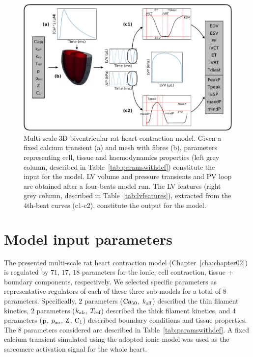 \begin{figure}[ht!]
    \myfloatalign
    \includegraphics[width=\textwidth]{figures/chapter03/simulator_framework.pdf}
    \caption{Multi-scale $3$D biventricular rat heart contraction model. Given a fixed calcium transient (a) and mesh with fibres (b), parameters representing cell, tissue and haemodynamics properties (left grey column, described in Table~\ref{tab:paramswithdef}) constitute the input for the model. LV volume and pressure transients and PV loop are obtained after a four-beats model run. The LV features (right grey column, described in Table~\ref{tab:lvfeatures}), extracted from the $4$th-beat curves (c1-c2), constitute the output for the model.}
    \label{fig:simulatorframework}
\end{figure}


%
%
%
\section{Model input parameters}\label{sec:ch3modelinputparameters}
The presented multi-scale rat heart contraction model (Chapter~\ref{cha:chapter02}) is regulated by $71$, $17$, $18$ parameters for the ionic, cell contraction, tissue $+$ boundary components, respectively. We selected specific parameters as representative regulators of each of these three sub-models for a total of $8$ parameters. Specifically, $2$ parameters ($\textrm{Ca}_{50}$, $k_{\textrm{off}}$) described the thin filament kinetics, $2$ parameters ($k_{\textrm{xb}}$, $T_{\textrm{ref}}$) described the thick filament kinetics, and $4$ parameters ($\textrm{p}$, $p_{\textrm{ao}}$, $\textrm{Z}$, $\textrm{C}_1$) described boundary conditions and tissue properties. The $8$ parameters considered are described in Table~\ref{tab:paramswithdef}. A fixed calcium transient simulated using the adopted ionic model was used as the sarcomere activation signal for the whole heart.

